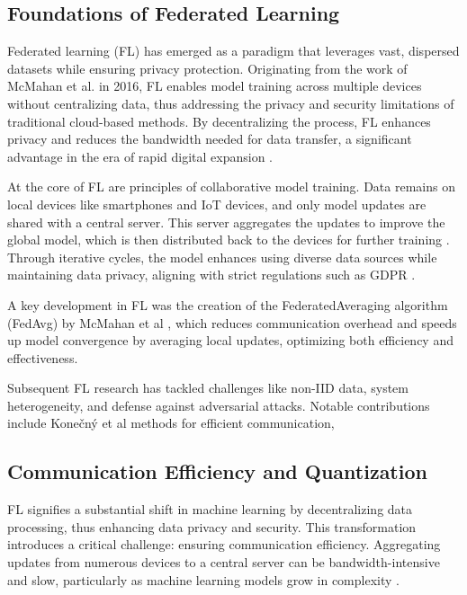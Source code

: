 \documentclass{article}
\begin{document}
\subsection{Foundations of Federated Learning} 
Federated learning (FL) has emerged as a paradigm that leverages vast, dispersed datasets while ensuring privacy protection. Originating from the work of McMahan et al.\cite{DBLP:journals/corr/McMahanMRA16} in 2016, FL enables model training across multiple devices without centralizing data, thus addressing the privacy and security limitations of traditional cloud-based methods. By decentralizing the process, FL enhances privacy and reduces the bandwidth needed for data transfer, a significant advantage in the era of rapid digital expansion \cite{ijerph20156539}.

At the core of FL are principles of collaborative model training. Data remains on local devices like smartphones and IoT devices, and only model updates are shared with a central server. This server aggregates the updates to improve the global model, which is then distributed back to the devices for further training \cite{Li_2020}. Through iterative cycles, the model enhances using diverse data sources while maintaining data privacy, aligning with strict regulations such as GDPR \cite{team2020eu}.

A key development in FL was the creation of the FederatedAveraging algorithm (FedAvg) by McMahan et al \cite{DBLP:journals/corr/abs-1710-06963}, which reduces communication overhead and speeds up model convergence by averaging local updates, optimizing both efficiency and effectiveness.

Subsequent FL research has tackled challenges like non-IID data, system heterogeneity, and defense against adversarial attacks. Notable contributions include Konečný et al\cite{DBLP:journals/corr/KonecnyMYRSB16} methods for efficient communication, 

\subsection{Communication Efficiency and Quantization}

FL signifies a substantial shift in machine learning by decentralizing data processing, thus enhancing data privacy and security. This transformation introduces a critical challenge: ensuring communication efficiency. Aggregating updates from numerous devices to a central server can be bandwidth-intensive and slow, particularly as machine learning models grow in complexity \cite{10.1093/comjnl/bxab184}.
\end{document}
